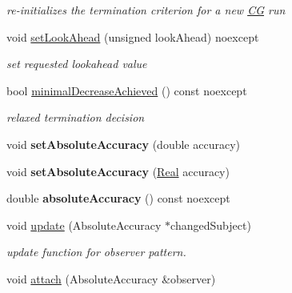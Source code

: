 \begin{DoxyCompactItemize}
\begin{DoxyCompactList}\small\item\em re-\/initializes the termination criterion for a new \hyperlink{namespaceSpacy_1_1CG}{C\+G} run \end{DoxyCompactList}\item 
void \hyperlink{classSpacy_1_1CG_1_1Termination_1_1StrakosTichyEnergyError_ac40343f544b7e2bfeffa7f7927cfeac5}{set\+Look\+Ahead} (unsigned look\+Ahead) noexcept
\begin{DoxyCompactList}\small\item\em set requested lookahead value \end{DoxyCompactList}\item 
bool \hyperlink{classSpacy_1_1CG_1_1Termination_1_1StrakosTichyEnergyError_af13fec942d9d9ec622803e226537ffec}{minimal\+Decrease\+Achieved} () const noexcept
\begin{DoxyCompactList}\small\item\em relaxed termination decision \end{DoxyCompactList}\item 
\hypertarget{classSpacy_1_1Mixin_1_1AbsoluteAccuracy_a71cfcdc0c504be63c18c3e78df157738}{}void {\bfseries set\+Absolute\+Accuracy} (double accuracy)\label{classSpacy_1_1Mixin_1_1AbsoluteAccuracy_a71cfcdc0c504be63c18c3e78df157738}

\item 
\hypertarget{classSpacy_1_1Mixin_1_1AbsoluteAccuracy_ad099a4a0a770133b56acaaf8783d4ba6}{}void {\bfseries set\+Absolute\+Accuracy} (\hyperlink{classSpacy_1_1Real}{Real} accuracy)\label{classSpacy_1_1Mixin_1_1AbsoluteAccuracy_ad099a4a0a770133b56acaaf8783d4ba6}

\item 
\hypertarget{classSpacy_1_1Mixin_1_1AbsoluteAccuracy_aaa1fbd611cf85a098b71c22986778d8a}{}double {\bfseries absolute\+Accuracy} () const noexcept\label{classSpacy_1_1Mixin_1_1AbsoluteAccuracy_aaa1fbd611cf85a098b71c22986778d8a}

\item 
\hypertarget{classSpacy_1_1Mixin_1_1AbsoluteAccuracy_a7e5910ba9a6ac7a4b332efdbbff27787}{}void \hyperlink{classSpacy_1_1Mixin_1_1AbsoluteAccuracy_a7e5910ba9a6ac7a4b332efdbbff27787}{update} (Absolute\+Accuracy $\ast$changed\+Subject)\label{classSpacy_1_1Mixin_1_1AbsoluteAccuracy_a7e5910ba9a6ac7a4b332efdbbff27787}

\begin{DoxyCompactList}\small\item\em update function for observer pattern. \end{DoxyCompactList}\item 
\hypertarget{classSpacy_1_1Mixin_1_1MixinConnection_abb5520ee6b22dd993d78f142939a1ed4}{}void \hyperlink{classSpacy_1_1Mixin_1_1MixinConnection_abb5520ee6b22dd993d78f142939a1ed4}{attach} (Absolute\+Accuracy \&observer)\label{classSpacy_1_1Mixin_1_1MixinConnection_abb5520ee6b22dd993d78f142939a1ed4}


\end{DoxyCompactItemize}
